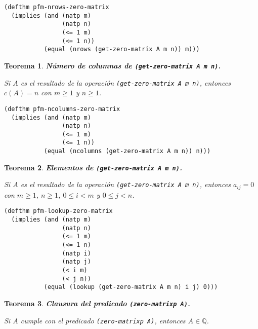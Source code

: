 \documentclass[a4paper,10pt]{article}
\newcommand{\Q}[1]{#1 \in \mathbb{Q}}
\newtheorem{teor}{{Teorema}}
\begin{document}
\begin{lstlisting}[language=clips]
(defthm pfm-nrows-zero-matrix
  (implies (and (natp m)
                (natp n)
                (<= 1 m)
                (<= 1 n))
           (equal (nrows (get-zero-matrix A m n)) m)))
\end{lstlisting}

\par \vspace{16pt}

\begin{teor} \textbf{Número de columnas de \texttt{(get-zero-matrix A m n)}.}\vspace{8pt}\par
Si $A$ es el resultado de la operación \texttt{(get-zero-matrix A m n)}, entonces $c(A)=n$ con $m \geq 1$ y $n \geq 1$.
\end{teor}

\begin{lstlisting}[language=clips]
(defthm pfm-ncolumns-zero-matrix
  (implies (and (natp m)
                (natp n)
                (<= 1 m)
                (<= 1 n))
           (equal (ncolumns (get-zero-matrix A m n)) n)))
\end{lstlisting}

\par \vspace{16pt}

\begin{teor} \textbf{Elementos de \texttt{(get-zero-matrix A m n)}.}\vspace{8pt}\par
Si $A$ es el resultado de la operación \texttt{(get-zero-matrix A m n)}, entonces $a_{ij}=0$ con $m \geq 1$, $n \geq 1$, $0 \leq i < m$ y $0 \leq j < n$.
\end{teor}

\begin{lstlisting}[language=clips]
(defthm pfm-lookup-zero-matrix
  (implies (and (natp m)
                (natp n)
                (<= 1 m)
                (<= 1 n)
                (natp i)
                (natp j)
                (< i m)
                (< j n))
           (equal (lookup (get-zero-matrix A m n) i j) 0)))
\end{lstlisting}

\par \vspace{16pt}

\begin{teor} \textbf{Clausura del predicado \texttt{(zero-matrixp A)}.}\vspace{8pt}\par
Si $A$ cumple con el predicado \texttt{(zero-matrixp A)}, entonces $\Q{A}$.
\end{teor}
\end{document}

